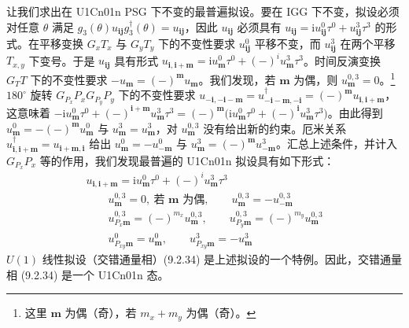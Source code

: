 让我们求出在 U1Cn01n PSG 下不变的最普遍拟设。要在 IGG 下不变，拟设必须对任意 $\theta$ 满足 $g_{3}(\theta)u_{\pmb{ij}}g_{3}^{\dagger}(\theta)=u_{\pmb{ij}}$，因此 $u_{\pmb{ij}}$ 必须具有 $u_{\pmb{ij}}=\mathrm{i}u_{\pmb{ij}}^{0}\tau^{0}+u_{\pmb{ij}}^{3}\tau^{3}$ 的形式。在平移变换 $G_{x}T_{x}$ 与 $G_{y}T_{y}$ 下的不变性要求 $u_{\pmb{ij}}^{0}$ 平移不变，而 $u_{\pmb{ij}}^{3}$ 在两个平移 $T_{x,y}$ 下变号。于是 $u_{\pmb{ij}}$ 具有形式 $u_{\pmb{i},\pmb{i}+\pmb{m}}=\mathrm{i}u_{\pmb{m}}^{0}\tau^{0}+(-)^{i}u_{\pmb{m}}^{3}\tau^{3}$。时间反演变换 $G_{T}T$ 下的不变性要求 $-u_{\pmb{m}}=(-)^{\pmb{m}}u_{\pmb{m}}$。我们发现，若 $\pmb{m}$ 为偶，则 $u_{\pmb{m}}^{0,3}=0$。\footnote{这里 $\pmb{m}$ 为偶（奇），若 $m_{x}+m_{y}$ 为偶（奇）。}$180^{\circ}$ 旋转 $G_{P_{x}}P_{x}G_{P_{y}}P_{y}$ 下的不变性要求 $u_{-\pmb{i},-\pmb{i}-\pmb{m}}=u_{-\pmb{i}-\pmb{m},-\pmb{i}}^{\dagger}=(-)^{\pmb{m}}u_{\pmb{i},\pmb{i}+\pmb{m}}$，这意味着 $-\mathrm{i}u_{\pmb{m}}^{0}\tau^{0}+(-)^{\pmb{i}+\pmb{m}}u_{\pmb{m}}^{3}\tau^{3}=(-)^{\pmb{m}}\big(\mathrm{i}u_{\pmb{m}}^{0}\tau^{0}+(-)^{\pmb{i}}u_{\pmb{m}}^{3}\tau^{3}\big)$。由此得到 $u_{\pmb{m}}^{0}=-(-)^{\pmb{m}}u_{\pmb{m}}^{0}$ 与 $u_{\pmb{m}}^{3}=u_{\pmb{m}}^{3}$，对 $u_{\pmb{m}}^{0,3}$ 没有给出新的约束。厄米关系 $u_{\pmb{i},\pmb{i}+\pmb{m}}^{\dagger}=u_{\pmb{i}+\pmb{m},\pmb{i}}$ 给出 $u_{\pmb{m}}^{0}=-u_{-\pmb{m}}^{0}$ 与 $u_{\pmb{m}}^{3}=(-)^{\pmb{m}}u_{-\pmb{m}}^{3}$。汇总上述条件，并计入 $G_{P_{x}}P_{x}$ 等的作用，我们发现最普遍的 U1Cn01n 拟设具有如下形式：
\begin{equation*}
\begin{array}{l}
u_{\pmb{i},\pmb{i}+\pmb{m}}=\mathrm{i}u_{\pmb{m}}^{0}\tau^{0}+(-)^{i}u_{\pmb{m}}^{3}\tau^{3}\\[2pt]
\qquad u_{\pmb{m}}^{0,3}=0,\ \text{若 }\pmb{m}\text{ 为偶},\qquad u_{\pmb{m}}^{0,3}=-u_{-\pmb{m}}^{0,3}\\[2pt]
\qquad u_{P_{x}\pmb{m}}^{0,3}=(-)^{m_{x}}u_{\pmb{m}}^{0,3},\qquad u_{P_{y}\pmb{m}}^{0,3}=(-)^{m_{y}}u_{\pmb{m}}^{0,3}\\[2pt]
\qquad u_{P_{xy}\pmb{m}}^{0}=u_{\pmb{m}}^{0},\qquad u_{P_{xy}\pmb{m}}^{3}=-u_{\pmb{m}}^{3}
\end{array}
\end{equation*}
$U(1)$ 线性拟设（交错通量相）(9.2.34) 是上述拟设的一个特例。因此，交错通量相 (9.2.34) 是一个 U1Cn01n 态。

